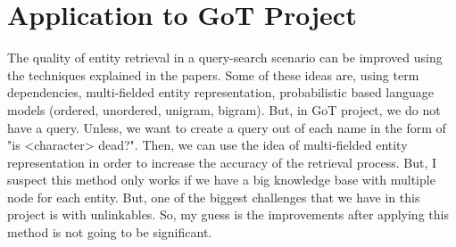\documentclass[letterpaper]{article}
\begin{document}
\section{Application to GoT Project}

The quality of entity retrieval in a query-search scenario can be improved using the techniques explained in the papers. Some of these ideas are, using term dependencies, multi-fielded entity representation, probabilistic based language models (ordered, unordered, unigram, bigram). But, in GoT project, we do not have a query. Unless, we want to create a query out of each name in the form of "is <character> dead?". Then, we can use the idea of multi-fielded entity representation in order to increase the accuracy of the retrieval process. But, I suspect this method only works if we have a big knowledge base with multiple node for each entity. But, one of the biggest challenges that we have in this project is with unlinkables. So, my guess is the improvements after applying this method is not going to be significant.



\end{document}
